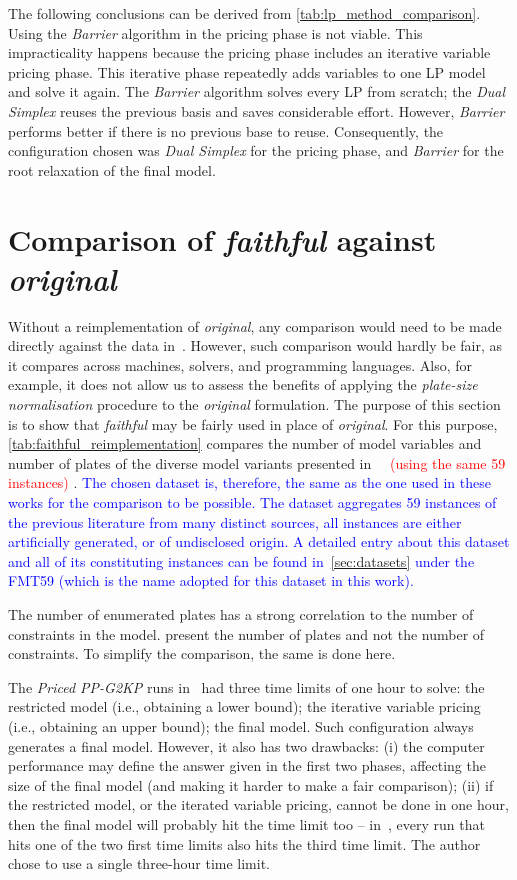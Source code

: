 \documentclass[ppgc,tese,english,formais,babel]{iiufrgs}
\newif\iffinalversion
\newcommand{\newtext}[1]{\iffinalversion%
#1%
\else%
\textcolor{blue}{#1}%
\fi%
}
\newcommand{\oldtext}[1]{\iffinalversion%
\else%
\textcolor{red}{#1}%
\fi%
}
\begin{document}
The following conclusions can be derived from \cref{tab:lp_method_comparison}.
Using the \emph{Barrier} algorithm in the pricing phase is not viable.
This impracticality happens because the pricing phase includes an iterative variable pricing phase.
This iterative phase repeatedly adds variables to one LP model and solve it again.
The \emph{Barrier} algorithm solves every LP from scratch;
the \emph{Dual Simplex} reuses the previous basis and saves considerable effort.
However, \emph{Barrier} performs better if there is no previous base to reuse.
Consequently, the configuration chosen was \emph{Dual Simplex} for the pricing phase, and \emph{Barrier} for the root relaxation of the final model.

\section{Comparison of \emph{faithful} against \emph{original}}
\label{sec:faithful_reimplementation}

Without a reimplementation of \emph{original}, any comparison would need to be made directly against the data in~\citet{dimitri_thesis}.
However, such comparison would hardly be fair, as it compares across machines, solvers, and programming languages.
Also, for example, it does not allow us to assess the benefits of applying the \emph{plate-size normalisation} procedure to the \emph{original} formulation.
The purpose of this section is to show that \emph{faithful} may be fairly used in place of \emph{original}.
For this purpose, \cref{tab:faithful_reimplementation} compares the number of model variables and number of plates of the diverse model variants presented in~\citet{dimitri_thesis}\oldtext{~(using the same 59 instances)}.
\newtext{The chosen dataset is, therefore, the same as the one used in these works for the comparison to be possible. The dataset aggregates 59 instances of the previous literature from many distinct sources, all instances are either artificially generated, or of undisclosed origin. A detailed entry about this dataset and all of its constituting instances can be found in~\cref{sec:datasets} under the FMT59 (which is the name adopted for this dataset in this work).}
The number of enumerated plates has a strong correlation to the number of constraints in the model.
\citet{dimitri_thesis} present the number of plates and not the number of constraints.
To simplify the comparison, the same is done here.

The \emph{Priced PP-G2KP} runs in~\citet{dimitri_thesis} had three time limits of one hour to solve: the restricted model (i.e., obtaining a lower bound); the iterative variable pricing (i.e., obtaining an upper bound); the final model.
Such configuration always generates a final model.
However, it also has two drawbacks:
(i) the computer performance may define the answer given in the first two phases, affecting the size of the final model (and making it harder to make a fair comparison);
(ii) if the restricted model, or the iterated variable pricing, cannot be done in one hour, then the final model will probably hit the time limit too -- in~\citet{dimitri_thesis}, every run that hits one of the two first time limits also hits the third time limit.
The author chose to use a single three-hour time limit.
\end{document}
